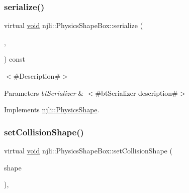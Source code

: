 \mbox{\label{classnjli_1_1_physics_shape_box_a3c8a170c8a0a3bb3184886d9657df74c}} 
\subsubsection{\texorpdfstring{serialize()}{serialize()}}
{\footnotesize\ttfamily virtual \mbox{\hyperlink{_thread_8h_af1e856da2e658414cb2456cb6f7ebc66}{void}} njli\+::\+Physics\+Shape\+Box\+::serialize (\begin{DoxyParamCaption}\item[{\mbox{\hyperlink{_thread_8h_af1e856da2e658414cb2456cb6f7ebc66}{void}} $\ast$}]{,  }\item[{bt\+Serializer $\ast$}]{ }\end{DoxyParamCaption}) const\hspace{0.3cm}{\ttfamily [virtual]}}

$<$\#\+Description\#$>$


\begin{DoxyParams}{Parameters}
{\em bt\+Serializer} & $<$\#bt\+Serializer description\#$>$ \\
\hline
\end{DoxyParams}


Implements \mbox{\hyperlink{classnjli_1_1_physics_shape_a2ac8a109a5ad67ee79f40ce8f28337cf}{njli\+::\+Physics\+Shape}}.

\mbox{\label{classnjli_1_1_physics_shape_box_afef84525d2cb60ad5f2386a4faf4db9a}} 
\subsubsection{\texorpdfstring{set\+Collision\+Shape()}{setCollisionShape()}}
{\footnotesize\ttfamily virtual \mbox{\hyperlink{_thread_8h_af1e856da2e658414cb2456cb6f7ebc66}{void}} njli\+::\+Physics\+Shape\+Box\+::set\+Collision\+Shape (\begin{DoxyParamCaption}\item[{const bt\+Collision\+Shape \&}]{shape }\end{DoxyParamCaption})\hspace{0.3cm}{\ttfamily [protected]}, {\ttfamily [virtual]}}



